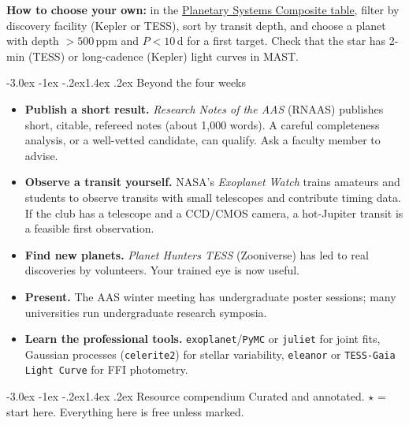 \documentclass[11pt,a4paper]{article}
\makeatletter
\renewcommand\section{\@startsection{section}{1}{\z@}%
  {-3.0ex \@plus -1ex \@minus -.2ex}{1.4ex \@plus .2ex}%
  {\normalfont\sffamily\LARGE\bfseries\color{navy}}}
\newcommand{\pkg}[1]{\texttt{#1}}
\makeatother
\begin{document}
\textbf{How to choose your own:} in the
\href{https://exoplanetarchive.ipac.caltech.edu/cgi-bin/TblView/nph-tblView?app=ExoTbls&config=PSCompPars}{Planetary Systems Composite table},
filter by discovery facility (Kepler or TESS), sort by transit depth, and choose a planet with depth \(>500\)\,ppm and \(P<10\)\,d
for a first target. Check that the star has 2-min (TESS) or long-cadence (Kepler) light curves in MAST.

\section{Beyond the four weeks}
\label{sec:beyond}
\begin{itemize}
  \item \textbf{Publish a short result.} \emph{Research Notes of the AAS} (RNAAS) publishes short, citable, refereed notes (about 1{,}000
        words). A careful completeness analysis, or a well-vetted candidate, can qualify. Ask a faculty member to advise.
  \item \textbf{Observe a transit yourself.} NASA's \emph{Exoplanet Watch} trains amateurs and students to observe transits with small
        telescopes and contribute timing data. If the club has a telescope and a CCD/CMOS camera, a hot-Jupiter transit is a feasible
        first observation.
  \item \textbf{Find new planets.} \emph{Planet Hunters TESS} (Zooniverse) has led to real discoveries by volunteers. Your trained eye is now useful.
  \item \textbf{Present.} The AAS winter meeting has undergraduate poster sessions; many universities run undergraduate research symposia.
  \item \textbf{Learn the professional tools.} \pkg{exoplanet}/\pkg{PyMC} or \pkg{juliet} for joint fits, Gaussian processes (\pkg{celerite2})
        for stellar variability, \pkg{eleanor} or \pkg{TESS-Gaia Light Curve} for FFI photometry.
\end{itemize}

\section{Resource compendium}
\label{sec:resources}
Curated and annotated. \(\star\) = start here. Everything here is free unless marked.
\end{document}
